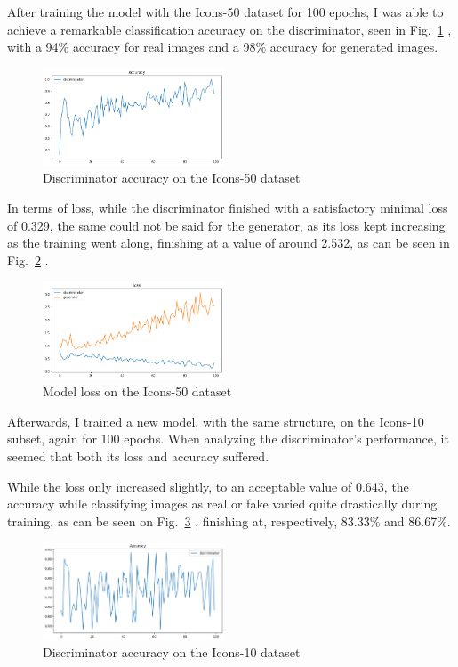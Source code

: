 After training the model with the Icons-50 dataset for 100 epochs, I was able to achieve a remarkable classification accuracy on the discriminator, seen in Fig.~\ref{fig:Icons50Acc} , with a 94\% accuracy for real images and a 98\% accuracy for generated images.

\begin{figure}[htbp]
    \centering
    \includegraphics[width=0.48\textwidth]{images/icons50/icons50_acc}
    \caption{Discriminator accuracy on the Icons-50 dataset}
    \label{fig:Icons50Acc}
\end{figure}

In terms of loss, while the discriminator finished with a satisfactory minimal loss of 0.329, the same could not be said for the generator, as its loss kept increasing as the training went along, finishing at a value of around 2.532, as can be seen in Fig.~\ref{fig:Icons50Loss} .

\begin{figure}[htbp]
    \centering
    \includegraphics[width=0.48\textwidth]{images/icons50/icons50_loss}
    \caption{Model loss on the Icons-50 dataset}
    \label{fig:Icons50Loss}
\end{figure}

Afterwards, I trained a new model, with the same structure, on the Icons-10 subset, again for 100 epochs.
When analyzing the discriminator's performance, it seemed that both its loss and accuracy suffered.

While the loss only increased slightly, to an acceptable value of 0.643, the accuracy while classifying images as real or fake varied quite drastically during training, as can be seen on Fig.~\ref{fig:Icons10Acc} , finishing at, respectively, 83.33\% and 86.67\%.

\begin{figure}[htbp]
    \centering
    \includegraphics[width=0.48\textwidth]{images/icons10/icons10_acc}
    \caption{Discriminator accuracy on the Icons-10 dataset}
    \label{fig:Icons10Acc}
\end{figure}

